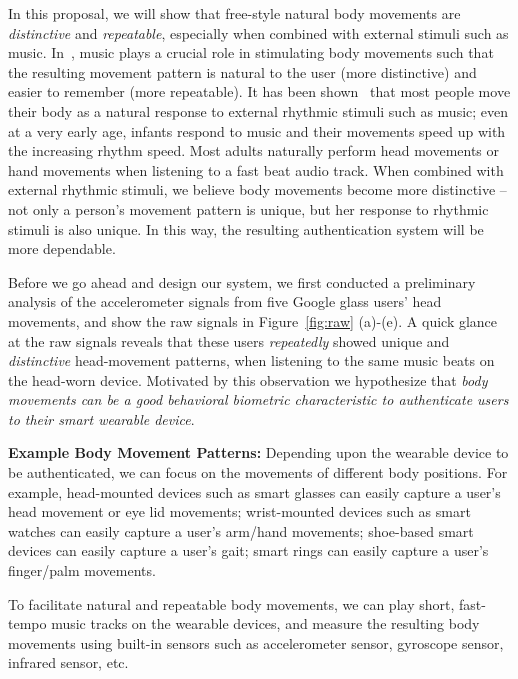 In this proposal, we will show that free-style natural body movements are \emph{distinctive} and \emph{repeatable}, especially when combined with external stimuli such as music. In~\systemname, music plays a crucial role in stimulating body movements such that the resulting movement pattern is natural to the user (more distinctive) and easier to remember (more repeatable). It has been shown~\cite{zentner2010rhythmic} that most people move
their body as a natural response to external rhythmic stimuli such as music;
even at a very early age, infants respond to music and their movements speed
up with the increasing rhythm speed. Most adults naturally
perform head movements or hand movements when listening to a fast beat audio track.  When combined with external rhythmic stimuli, we believe body movements become more distinctive -- not only a person's movement pattern is unique, but her response to rhythmic stimuli is also unique. In this way, the resulting authentication system will be more dependable.

Before we go ahead and design our system, we first conducted a preliminary analysis of the accelerometer signals from five Google glass
users' head movements, and show the raw signals in Figure~\ref{fig:raw} (a)-(e). A quick glance at the raw signals reveals that these users
{\em repeatedly} showed unique and {\em distinctive} head-movement patterns, when listening to the same music beats on the head-worn device. Motivated by this observation we hypothesize that \emph{body movements can be a good behavioral biometric characteristic to authenticate
users to their smart wearable device}.

\vspace{4pt}\textbf{Example Body Movement Patterns:} Depending upon the wearable device to be authenticated, we can focus on the movements of different body positions. For example, head-mounted devices such as smart glasses can easily capture a user's head movement or eye lid movements; wrist-mounted devices such as smart watches can easily capture a user's arm/hand movements; shoe-based smart devices can easily capture a user's gait; smart rings can easily capture a user's finger/palm movements.

To facilitate natural and repeatable body movements, we can play short, fast-tempo music tracks on the wearable devices, and measure the resulting body movements using built-in sensors such as accelerometer sensor, gyroscope sensor, infrared sensor, etc.




